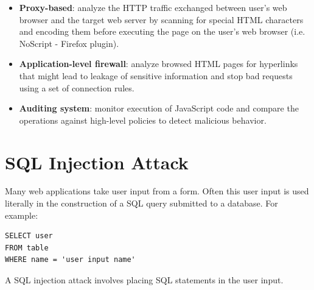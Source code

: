 \begin{itemize}
	\item \textbf{Proxy-based}: analyze the HTTP traffic exchanged between user's web browser and the target web server by scanning for special HTML characters and encoding them before executing the page on the user's web browser (i.e. NoScript -	Firefox plugin).
	\item \textbf{Application-level firewall}: analyze browsed HTML pages for hyperlinks that might lead to leakage of sensitive information and stop bad requests using a set of connection rules.
	\item \textbf{Auditing system}: monitor execution of JavaScript code and compare the operations against high-level policies to detect malicious behavior.
\end{itemize}

\section{SQL Injection Attack}
Many web applications take user input from a form. Often this user input is used literally in the construction of a SQL query submitted to a database. For example:
\begin{lstlisting}
SELECT user 
FROM table
WHERE name = 'user input name'
\end{lstlisting}
A SQL injection attack involves placing SQL statements in the user input.
